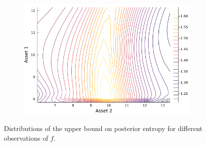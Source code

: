 \documentclass{article}
\begin{document}
\begin{figure}
\begin{subfigure}{0.4\textwidth}
    \end{subfigure}
    \begin{subfigure}{0.4\textwidth}
        \includegraphics[width=\textwidth]{../plots/params/more-corr-meanvarshift/entropy_upper.png}
    \end{subfigure}
    \caption{Distributions of the upper bound on posterior entropy for different observations of $f$.}
    \label{fig:entropy_upper}
\end{figure}
\end{document}
